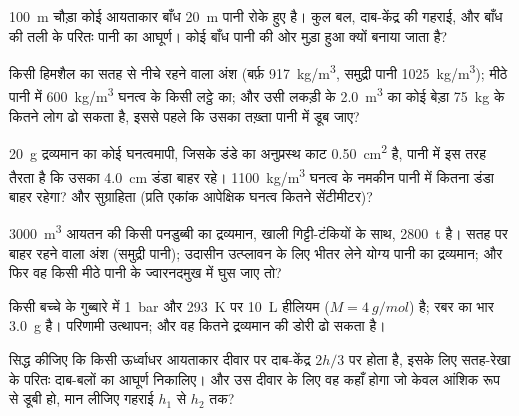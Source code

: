 \begin{exercise}[$\star\star$]\label{exo:b1:fluid-statics:6}
\qty{100}{m} चौड़ा कोई आयताकार बाँध \qty{20}{m} पानी रोके हुए है। कुल बल,
दाब-केंद्र की गहराई, और बाँध की तली के परितः पानी का आघूर्ण। कोई बाँध पानी
की ओर मुड़ा हुआ क्यों बनाया जाता है?
\end{exercise}

\begin{exercise}[$\star\star$]\label{exo:b1:fluid-statics:7}
किसी हिमशैल का सतह से नीचे रहने वाला अंश (बर्फ़ \qty{917}{kg/m^3}, समुद्री
पानी \qty{1025}{kg/m^3}); मीठे पानी में \qty{600}{kg/m^3} घनत्व के किसी
लट्ठे का; और उसी लकड़ी के \qty{2.0}{m^3} का कोई बेड़ा \qty{75}{kg} के कितने
लोग ढो सकता है, इससे पहले कि उसका तख़्ता पानी में डूब जाए?
\end{exercise}

\begin{exercise}[$\star\star$]\label{exo:b1:fluid-statics:8}
\qty{20}{g} द्रव्यमान का कोई घनत्वमापी, जिसके डंडे का अनुप्रस्थ काट
\qty{0.50}{cm^2} है, पानी में इस तरह तैरता है कि उसका \qty{4.0}{cm} डंडा
बाहर रहे। \qty{1100}{kg/m^3} घनत्व के नमकीन पानी में कितना डंडा बाहर
रहेगा? और सुग्राहिता (प्रति एकांक आपेक्षिक घनत्व कितने सेंटीमीटर)?
\end{exercise}

\begin{exercise}[$\star\star$]\label{exo:b1:fluid-statics:9}
\qty{3000}{m^3} आयतन की किसी पनडुब्बी का द्रव्यमान, खाली गिट्टी-टंकियों के
साथ, \qty{2800}{t} है। सतह पर बाहर रहने वाला अंश (समुद्री पानी); उदासीन
उत्प्लावन के लिए भीतर लेने योग्य पानी का द्रव्यमान; और फिर वह किसी मीठे
पानी के ज्वारनदमुख में घुस जाए तो?
\end{exercise}

\begin{exercise}[$\star\star\star$]\label{exo:b1:fluid-statics:10}
किसी बच्चे के गुब्बारे में \qty{1}{bar} और \qty{293}{K} पर \qty{10}{L}
हीलियम ($M = \qty{4}{g/mol}$) है; रबर का भार \qty{3.0}{g} है। परिणामी
उत्थापन; और वह कितने द्रव्यमान की डोरी ढो सकता है।
\end{exercise}

\begin{exercise}[$\star\star\star$]\label{exo:b1:fluid-statics:11}
सिद्ध कीजिए कि किसी ऊर्ध्वाधर आयताकार दीवार पर दाब-केंद्र
$2h/3$ पर होता है, इसके लिए सतह-रेखा के परितः दाब-बलों का आघूर्ण निकालिए।
और उस दीवार के लिए वह कहाँ होगा जो केवल आंशिक रूप से डूबी हो, मान लीजिए
गहराई $h_1$ से $h_2$ तक?
\end{exercise}

